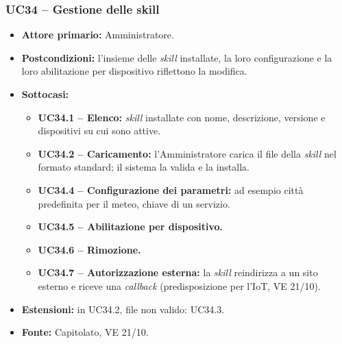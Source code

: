 \documentclass[12pt,a4paper]{article}
\newcommand{\tightlist}{\setlength{\itemsep}{1pt}\setlength{\parskip}{0pt}}
\begin{document}
\subsubsection{UC34 -- Gestione delle skill}

\begin{itemize}

\tightlist

\item \textbf{Attore primario:} Amministratore.

\item \textbf{Postcondizioni:} l'insieme delle \emph{skill} installate, la loro configurazione e la loro abilitazione per dispositivo riflettono la modifica.

\item \textbf{Sottocasi:}

\begin{itemize}

\tightlist

\item \textbf{UC34.1 -- Elenco:} \emph{skill} installate con nome, descrizione, versione e dispositivi su cui sono attive.

\item \textbf{UC34.2 -- Caricamento:} l'Amministratore carica il file della \emph{skill} nel formato standard; il sistema la valida e la installa.

\item \textbf{UC34.4 -- Configurazione dei parametri:} ad esempio città predefinita per il meteo, chiave di un servizio.

\item \textbf{UC34.5 -- Abilitazione per dispositivo.}

\item \textbf{UC34.6 -- Rimozione.}

\item \textbf{UC34.7 -- Autorizzazione esterna:} la \emph{skill} reindirizza a un sito esterno e riceve una \emph{callback} (predisposizione per l'IoT, VE 21/10).

\end{itemize}

\item \textbf{Estensioni:} in UC34.2, file non valido: UC34.3.

\item \textbf{Fonte:} Capitolato, VE 21/10.

\end{itemize}
\end{document}
